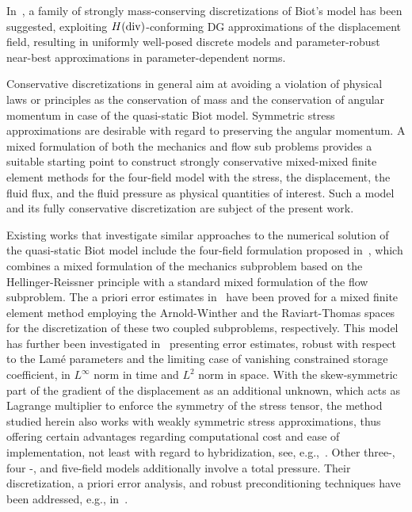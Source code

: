 \documentclass[11pt]{amsart}
\theoremstyle{remark}
\theoremstyle{definition}
\begin{document}
In~\cite{HongKraus2018parameter,KanschatRiviere2018finite}, a family of strongly mass-conserving
discretizations of Biot's model has been suggested, exploiting $H({\rm div})$-conforming DG approximations
of the displacement field, resulting in uniformly well-posed discrete models and parameter-robust near-best
approximations in parameter-dependent norms. 

Conservative discretizations in general aim at avoiding a violation of physical laws or principles as the
conservation of mass and the conservation of angular momentum in case of the quasi-static Biot model.
Symmetric stress approximations are desirable with regard to preserving the angular momentum. A mixed
formulation of both the mechanics and flow sub problems provides a suitable starting point to construct 
strongly conservative mixed-mixed finite element methods for the four-field model with the stress, the
displacement, the fluid flux, and the fluid pressure as physical quantities of interest. Such a model and
its fully conservative discretization are subject of the present work.
    
Existing works that investigate similar approaches to the numerical solution of the quasi-static Biot model
include the four-field formulation proposed in~\cite{Yi2014convergence}, which combines a mixed formulation
of the mechanics subproblem based on the Hellinger-Reissner principle with a standard mixed formulation of
the flow subproblem. The a priori error estimates in~\cite{Yi2014convergence} have been proved for a mixed
finite element method employing the Arnold-Winther and the Raviart-Thomas spaces for the discretization of
these two coupled subproblems, respectively.  
This model has further been investigated in~\cite{Lee2016robust} presenting error estimates, robust with respect
to the Lam\'{e} parameters and the limiting case of vanishing constrained storage coefficient, in $L^\infty$ norm
in time and $L^2$ norm in space.
With the skew-symmetric part of the gradient of the displacement as an additional unknown, which acts as
Lagrange multiplier to enforce the symmetry of the stress tensor, the method studied herein also works with
weakly symmetric stress approximations, thus offering certain advantages regarding computational cost and
ease of implementation, not least with regard to hybridization, see,
e.g.,~\cite{ArnoldBrezzi1985mixed,CockburnGopalakrishnan2004characterization}.
Other three-, four -, and five-field models additionally involve a total pressure. Their discretization, a priori error
analysis, and robust preconditioning techniques have been addressed, e.g.,
in~\cite{oyarzua2016locking,Lee2017parameter,
Lee2023analysis}.
\end{document}
